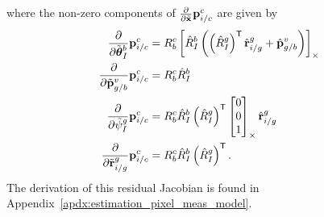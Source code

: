where the non-zero components of $\frac{\partial}{\partial \tilde{\boldsymbol{\mathrm{x}}}}
\boldsymbol{\mathrm{p}}_{i/c}^c$ are given by
\begin{align}
  \frac{\partial}{\partial \tilde{\boldsymbol{\mathrm{\theta}}}_I^b } \boldsymbol{\mathrm{p}}_{i/c}^c
  &=
  R_b^c \left[  \hat{R}_I^b \left( \left( \hat{R}_I^g \right)^{\mathsf{T}}
  \hat{\boldsymbol{\mathrm{r}}}_{i/g}^g + \hat{\boldsymbol{\mathrm{p}}}_{g/b}^v \right)  \right]_{\times} \\
  \frac{\partial}{\partial \tilde{\boldsymbol{\mathrm{p}}}_{g/b}^v} \boldsymbol{\mathrm{p}}_{i/c}^c
  &=
  R_b^c \hat{R}_I^b \\
  \frac{\partial}{\partial \tilde{\psi}_I^g} \boldsymbol{\mathrm{p}}_{i/c}^c
  &=
  R_b^c \hat{R}_I^b \left( \hat{R}_I^g \right)^{\mathsf{T}}
  \left[ \begin{matrix} 0 \\ 0 \\ 1 \end{matrix} \right]_{\times} \hat{\boldsymbol{\mathrm{r}}}_{i/g}^g \\
  \frac{\partial}{\partial \tilde{\boldsymbol{\mathrm{r}}}_{i/g}^g} \boldsymbol{\mathrm{p}}_{i/c}^c
  &=
  R_b^c \hat{R}_I^b \left( \hat{R}_I^g \right)^{\mathsf{T}} .
\end{align}
The derivation of this residual Jacobian is found in
Appendix~\ref{apdx:estimation_pixel_meas_model}.




